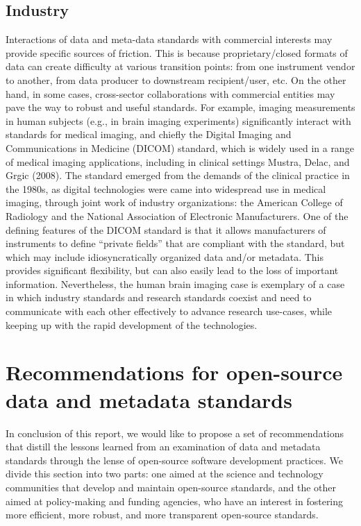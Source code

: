 \documentclass[
  letterpaper,
  DIV=11,
  numbers=noendperiod]{scrartcl}
\begin{document}
\subsection{Industry}\label{industry}

Interactions of data and meta-data standards with commercial interests
may provide specific sources of friction. This is because
proprietary/closed formats of data can create difficulty at various
transition points: from one instrument vendor to another, from data
producer to downstream recipient/user, etc. On the other hand, in some
cases, cross-sector collaborations with commercial entities may pave the
way to robust and useful standards. For example, imaging measurements in
human subjects (e.g., in brain imaging experiments) significantly
interact with standards for medical imaging, and chiefly the Digital
Imaging and Communications in Medicine (DICOM) standard, which is widely
used in a range of medical imaging applications, including in clinical
settings Mustra, Delac, and Grgic (2008). The standard emerged from the
demands of the clinical practice in the 1980s, as digital technologies
were came into widespread use in medical imaging, through joint work of
industry organizations: the American College of Radiology and the
National Association of Electronic Manufacturers. One of the defining
features of the DICOM standard is that it allows manufacturers of
instruments to define ``private fields'' that are compliant with the
standard, but which may include idiosyncratically organized data and/or
metadata. This provides significant flexibility, but can also easily
lead to the loss of important information. Nevertheless, the human brain
imaging case is exemplary of a case in which industry standards and
research standards coexist and need to communicate with each other
effectively to advance research use-cases, while keeping up with the
rapid development of the technologies.

\section{Recommendations for open-source data and metadata
standards}\label{sec-recommendations}

In conclusion of this report, we would like to propose a set of
recommendations that distill the lessons learned from an examination of
data and metadata standards through the lense of open-source software
development practices. We divide this section into two parts: one aimed
at the science and technology communities that develop and maintain
open-source standards, and the other aimed at policy-making and funding
agencies, who have an interest in fostering more efficient, more robust,
and more transparent open-source standards.
\end{document}
